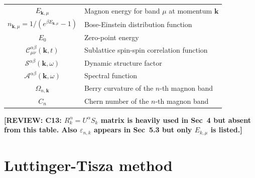 \documentclass[aps, prx, nofootinbib, superscriptaddress]{revtex4-2}
\newcommand{\REVIEW}[1]{{\color{reviewcolor}\bfseries [REVIEW: #1]}}
\newcommand{\kvec}{\mathbf{k}}
\begin{document}
\begin{table}[!b]
\begin{tabular}{c|l}
    \hline
    $E_{\kvec,\mu}$ & Magnon energy for band $\mu$ at momentum $\kvec$ \\
    $n_{\kvec,\mu} = 1/(e^{\beta E_{\kvec,\mu}}-1)$ & Bose-Einstein distribution function \\
    $E_0$ & Zero-point energy \\
    $\mathcal{C}^{\alpha\beta}_{\mu\nu}(\kvec, t)$ & Sublattice spin-spin correlation function \\
    $\mathcal{S}^{\alpha\beta}(\kvec, \omega)$ & Dynamic structure factor \\
    $\mathcal{A}^{\alpha\beta}(\kvec, \omega)$ & Spectral function \\
    $\Omega_{n,\kvec}$ & Berry curvature of the $n$-th magnon band \\
    $C_n$ & Chern number of the $n$-th magnon band \\
    \hline
    \end{tabular}
\end{table}

\REVIEW{C13: $R^\alpha_k = U^\alpha S_k$ matrix is heavily used in Sec~4 but absent from this table. Also $\varepsilon_{n,k}$ appears in Sec~5.3 but only $E_{k,\mu}$ is listed.}


\newpage

\section{Luttinger-Tisza method}\label{app:luttinger-tisza}

\end{document}

